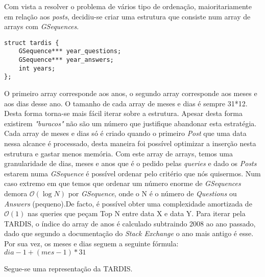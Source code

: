 \documentclass[letterpaper, 10 pt, conference]{IEEEtran}  %
\begin{document}
Com vista a resolver o problema de vários tipo de ordenação, maioritariamente em relação aos \textit{posts}, decidiu-se criar uma estrutura que consiste num array de arrays com \textit{GSequences}.
\begin{lstlisting}
struct tardis {
    GSequence*** year_questions;
    GSequence*** year_answers;
    int years;
};

\end{lstlisting}
O primeiro array corresponde aos anos, o segundo array corresponde aos meses e aos dias desse ano. O tamanho de cada array de meses e dias é sempre 31*12. Desta forma torna-se mais fácil iterar sobre a estrutura. Apesar desta forma existirem \textit{"buracos"} não são um número que justifique abandonar esta estratégia.
Cada array de meses e dias só é criado quando o primeiro \textit{Post} que uma data nessa alcance é processado, desta maneira foi possível optimizar a inserção nesta estrutura e gastar menos memória.
Com este array de arrays, temos uma granularidade de dias, meses e anos que é o pedido pelas \textit{queries} e dado os \textit{Posts} estarem numa \textit{GSequence} é possível ordenar pelo critério que nós quisermos.
Num caso extremo em que temos que ordenar um número enorme de \textit{GSequences} demora $\mathcal{O}(\log{}N)$ por \textit{GSequence}, onde o N é o número de \textit{Questions} ou \textit{Answers} (pequeno).De facto, é possível obter uma complexidade amortizada de $\mathcal{O}(1)$ nas queries que peçam Top N entre data X e data Y.
Para iterar pela TARDIS, o índice do array de anos é calculado subtraindo 2008 ao ano passado, dado que segundo a documentação do \textit{Stack Exchange} o ano mais antigo é esse. Por sua vez, os meses e dias seguem a seguinte fórmula:
$dia-1 + (mes-1)*31$

Segue-se uma representação da TARDIS.
\end{document}
